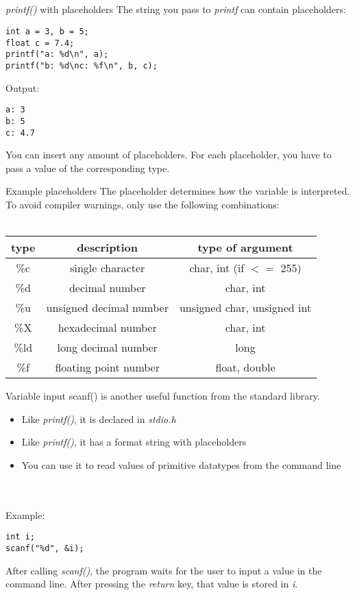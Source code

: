 \subsection{}
\begin{frame}[fragile]{\textit{printf()} with placeholders}
	The string you pass to \textit{printf} can contain placeholders:
	\begin{lstlisting}[numbers=none]
int a = 3, b = 5;
float c = 7.4;
printf("a: %d\n", a);
printf("b: %d\nc: %f\n", b, c);
\end{lstlisting}
Output:\begin{lstlisting}[numbers=none]
a: 3
b: 5
c: 4.7
\end{lstlisting}
You can insert any amount of placeholders. For each placeholder, you have to pass a value of the corresponding type.
\end{frame}
\begin{frame}{Example placeholders}
	The placeholder determines how the variable is interpreted.
	To avoid compiler warnings, only use the following combinations: \\ \ \\
	\begin{tabular}{|c|c|c|}
		\hline
		\textbf{type} & \textbf{description} & \textbf{type of argument} \\\hline
		\%c & single character & char, int (if $<=$ 255) \\\hline
		\%d & decimal number & char, int \\\hline
		\%u & unsigned decimal number & unsigned char, unsigned int \\\hline
		\%X & hexadecimal number & char, int \\\hline
		\%ld & long decimal number & long \\\hline
		\%f & floating point number & float, double \\\hline
	\end{tabular}
\end{frame}
\begin{frame}[fragile]{Variable input}
	scanf() is another useful function from the standard library.
	\begin{itemize}
		\item Like \textit{printf()}, it is declared in \textit{stdio.h}
		\item Like \textit{printf()}, it has a format string with placeholders
		\item You can use it to read values of primitive datatypes from the command line
	\end{itemize}
	\ \\ \ \\ Example:
	\begin{lstlisting}[numbers=none]
int i;
scanf("%d", &i);	
\end{lstlisting}
	After calling \textit{scanf()}, the program waits for the user to input a value in the command line.
	After pressing the \textit{return} key, that value is stored in \textit{i}.
\end{frame}
